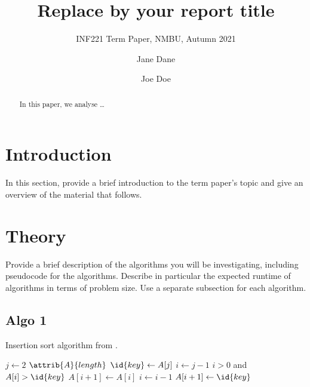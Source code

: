 \documentclass[sigconf, nonacm, natbib, screen, balance=False]{acmart}
\begin{document}
\title{Replace by your report title}
\subtitle{INF221 Term Paper, NMBU, Autumn 2021}

\author{Jane Dane}
\affiliation{}  %

\author{Joe Doe}

\begin{abstract}
  In this paper, we analyse \dots 
\end{abstract}


\maketitle

\section{Introduction}\label{sec:intro}

In this section, provide a brief introduction to the term paper's
topic and give an overview of the material that follows.

\section{Theory}\label{sec:theory}

Provide a brief description of the algorithms you will be
investigating, including pseudocode for the algorithms. Describe in
particular the expected runtime of algorithms in terms of problem
size.  Use a separate subsection for each algorithm.

\subsection{Algo 1}\label{sec:algo1}

\begin{listing}
  \caption{Insertion sort algorithm from \citet[Ch.~2.1]{CLRS_2009}.}
  \label{lst:insertion_algo}
  \begin{codebox}
    \li \For $j \gets 2$ \To $\attrib{A}{length}$
    \li \Do
    $\id{key} \gets A[j]$
    \li     $i \gets j-1$
    \li      \While $i>0$ and $A[i] > \id{key}$
    \li      \Do
    $A[i+1] \gets A[i]$
    \li         $i \gets i-1$
    \End    
    \li       $A[i+1]\gets \id{key}$
    \End
  \end{codebox}
\end{listing}
\end{document}
